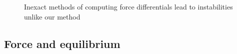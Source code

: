 \begin{figure}[th]
\caption{Inexact methods of computing force differentials lead to instabilities
unlike our method}
\label{fig:warpedstiff}
\end{figure}

\subsection{Force and equilibrium}
\label{sec:force}

